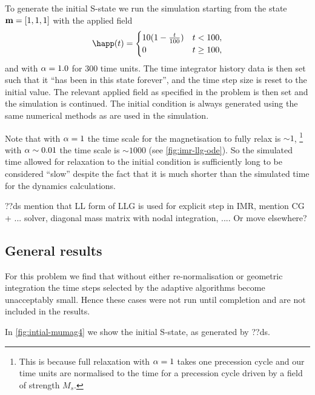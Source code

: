 To generate the initial S-state we run the simulation starting from the state $\boldsymbol{\mathrm{m}}=[1,1,1]$ with the applied field
\begin{equation}
  \happ(t) =
  \begin{cases}
    10 (1- \frac{t}{100}) & t < 100, \\
    0 & t \geq 100,
  \end{cases}
\end{equation}
and with $\alpha = 1.0$ for 300 time units.
The time integrator history data is then set such that it ``has been in this state forever'', and the time step size is reset to the initial value.
The relevant applied field as specified in the problem is then set and the simulation is continued.
The initial condition is always generated using the same numerical methods as are used in the simulation.

Note that with $\alpha = 1$ the time scale for the magnetisation to fully relax is $\sim 1$, \footnote{This is because full relaxation with $\alpha = 1$ takes one precession cycle and our time units are normalised to the time for a precession cycle driven by a field of strength $M_s$.} with $\alpha \sim 0.01$ the time scale is $\sim 1000$ (see \eg \cref{fig:imr-llg-ode}).
So the simulated time allowed for relaxation to the initial condition is sufficiently long to be considered ``slow'' despite the fact that it is much shorter than the simulated time for the dynamics calculations.



??ds mention that LL form of LLG is used for explicit step in IMR, mention CG + ... solver, diagonal mass matrix with nodal integration, .... Or move elsewhere?




\subsection{General results}

For this problem we find that without either re-normalisation or geometric integration the time steps selected by the adaptive algorithms become unacceptably small.
Hence these cases were not run until completion and are not included in the results.

In \cref{fig:intial-mumag4} we show the initial S-state, as generated by ??ds.

